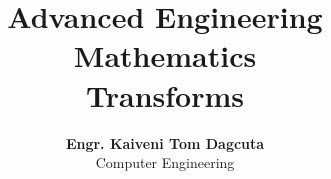 \documentclass[12pt]{article}
\title{Advanced Engineering Mathematics \\ \large Transforms}
\author{\textbf{Engr. Kaiveni Tom Dagcuta} \\ Computer Engineering}
\date{}
\begin{document}


\newpage



\bigskip



\bigskip



\bigskip



\bigskip



% 

% 
\end{document}
